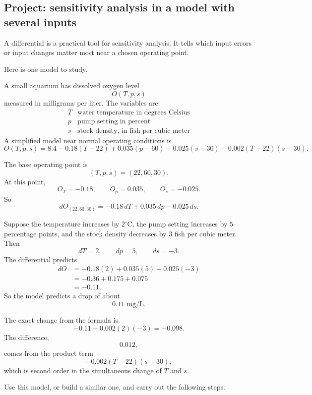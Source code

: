 \subsection*{Project: sensitivity analysis in a model with several inputs}

A differential is a practical tool for sensitivity analysis.  It tells which input errors or
input changes matter most near a chosen operating point.

Here is one model to study.

A small aquarium has dissolved oxygen level
\[
    O(T,p,s)
\]
measured in milligrams per liter.  The variables are:
\[
\begin{array}{c|c}
T & \text{water temperature in degrees Celsius}\\
p & \text{pump setting in percent}\\
s & \text{stock density, in fish per cubic meter}
\end{array}
\]
A simplified model near normal operating conditions is
\[
    O(T,p,s)
    =
    8.4
    -0.18(T-22)
    +0.035(p-60)
    -0.025(s-30)
    -0.002(T-22)(s-30).
\]

The base operating point is
\[
    (T,p,s)=(22,60,30).
\]
At this point,
\[
    O_T=-0.18,\qquad O_p=0.035,\qquad O_s=-0.025.
\]
So
\[
\boxed{
    dO_{(22,60,30)}
    =
    -0.18\,dT+0.035\,dp-0.025\,ds.
}
\]

Suppose the temperature increases by \(2^\circ\)C, the pump setting increases by
\(5\) percentage points, and the stock density decreases by \(3\) fish per cubic meter.
Then
\[
    dT=2,\qquad dp=5,\qquad ds=-3.
\]
The differential predicts
\[
\begin{aligned}
    dO
    &=
    -0.18(2)+0.035(5)-0.025(-3)\\
    &=
    -0.36+0.175+0.075\\
    &=
    -0.11.
\end{aligned}
\]
So the model predicts a drop of about
\[
    0.11\text{ mg/L}.
\]

The exact change from the formula is
\[
    -0.11-0.002(2)(-3)=-0.098.
\]
The difference,
\[
    0.012,
\]
comes from the product term
\[
    -0.002(T-22)(s-30),
\]
which is second order in the simultaneous change of \(T\) and \(s\).

Use this model, or build a similar one, and carry out the following steps.

